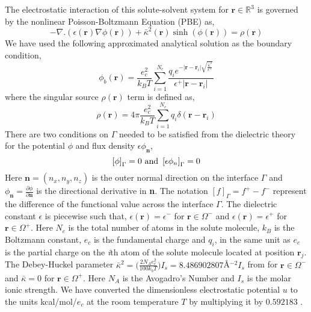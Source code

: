 The electrostatic interaction of this solute-solvent system for $\textbf{r} \in \mathbb{R}^3$ is governed by the nonlinear Poisson-Boltzmann Equation (PBE) as, 
\begin{equation}
			-\nabla.(\epsilon(\textbf{r})\nabla \phi(\textbf{r}))+\bar\kappa^2(\textbf{r}) \sinh (\phi(\textbf{r}))=\rho(\textbf{r})\label{pbe} %
\end{equation}
We have used the following approximated analytical solution \cite{Holst1995} as the boundary condition,
\begin{equation}
	\phi_b (\textbf{r}) = \frac{e_c^2}{k_B T} \sum_{i=1}^{N_c} \frac{q_i e^{-|\textbf{r}-\textbf{r}_i | \sqrt{\frac{\bar\kappa^2}{\epsilon^+}} }}{\epsilon^{+}|\textbf{r}-\textbf{r}_i|} \label{bd_cond}
\end{equation}
where the singular source $\rho(\textbf{r})$ term is defined as,
\begin{equation}
	\rho(\textbf{r})= 4\pi \frac{e_c^2}{k_B T}\sum_{i=1}^{N_c} q_i \delta(\textbf{r}-\textbf{r}_i) \label{rho}
\end{equation}
There are two conditions on $\Gamma$ needed to be satisfied from the dielectric theory for the potential $\phi$ and flux density $\epsilon \phi_\textbf{n} $, 
\begin{equation}
\left[\phi \right]_\Gamma = 0 \textnormal{ and } \left[\epsilon\phi_n\right]_\Gamma = 0 \label{ju_cond}
\end{equation}
Here $\textbf{n}=(n_x,n_y,n_z)$ is the outer normal direction on the interface $\Gamma$ and $\phi_\textbf{n}= \frac{\partial \phi}{\partial\textbf{n}} $ is the directional derivative in \textbf{n}. The notation $[f]_\Gamma = f^+-f^-$ represent the difference of the functional value across the interface $\Gamma$. The dielectric constant $\epsilon$ is piecewise such that, $\epsilon(\textbf{r})=\epsilon^-$ for $\textbf{r} \in \Omega^-$ and $\epsilon(\textbf{r})=\epsilon^+$ for $\textbf{r} \in \Omega^+$. Here $N_c$ is the total number of atoms in the solute molecule, $k_B$ is the Boltzmann constant, $e_c$ is the fundamental charge and $q_i$, in the same unit as $e_c$ is the partial charge on the \textit{i}th atom of the solute molecule located at position $\textbf{r}_j$. The Debey-Huckel parameter $\bar\kappa^2 =\Big(\frac{2N_A e_c^2}{100 k_b T}\Big)I_s =  8.486902807$\AA$^{-2} I_s$ from \cite{Holst:1993} for $\textbf{r} \in \Omega^-$ and $\bar\kappa=0$ for $\textbf{r} \in \Omega^+$. Here $N_A$ is  the Avogadro’s Number and $I_s$ is the molar ionic strength. We have converted the dimensionless electrostatic potential $u$ to the units kcal/mol/$e_c$ at the room temperature $T$ by multiplying it by $0.592183$ \cite{Holst:1993}. 

